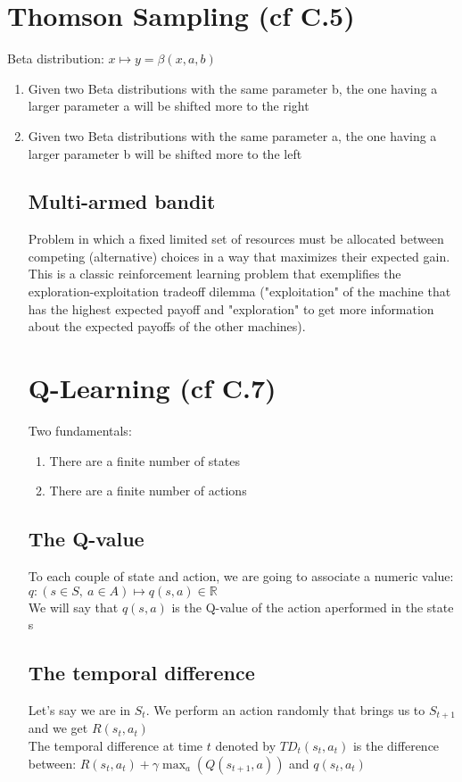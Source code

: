 \documentclass[french]{article}
\begin{document}
\section{Thomson Sampling (cf C.5)}
Beta distribution: $x \mapsto y = \beta(x,a,b)$\\


\begin{enumerate}
\item Given two Beta distributions with the same parameter b, the one having a larger parameter a will be shifted more to the right
\item Given two Beta distributions with the same parameter a, the one having a larger parameter b will be shifted more to the left

\subsection{Multi-armed bandit}

Problem in which a fixed limited set of resources must be allocated between competing (alternative) choices in a way that maximizes their expected gain.\\
This is a classic reinforcement learning problem that exemplifies the exploration-exploitation tradeoff dilemma ("exploitation" of the machine that has the highest expected payoff and "exploration" to get more information about the expected payoffs of the other machines).


\section{Q-Learning (cf C.7)}
Two fundamentals:
\begin{enumerate}
	\item There are a finite number of states
	\item There are a finite number of actions
\end{enumerate}

\subsection{The Q-value}
To each couple of state and action, we are going to associate a numeric value: $q: (s \in S,\ a \in A) \mapsto q(s,a) \in \mathbb{R}$\\
We will say that $q(s,a)$ is the Q-value of the action aperformed in the state s

\subsection{The temporal difference}
Let's say we are in $S_t$. We perform an action randomly that brings us to $S_{t+1}$ and we get $R(s_t, a_t)$\\
The temporal difference at time $t$ denoted by $TD_t(s_t,a_t)$ is the difference between: $R(s_t,a_t) + \gamma \max_a(Q(s_{t+1},a))$ and $q(s_t,a_t)$\\


\end{enumerate}
\end{document}
